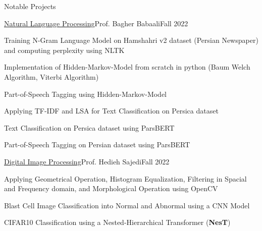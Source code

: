 \documentclass[]{main}
\begin{document}
\begin{section}{Notable Projects}
 \begin{subsection}{\href{https://github.com/ckoliber/nlpexercises}{Natural Language Processing}}{Prof. Bagher Babaali}{Fall 2022}{}
     \item Training N-Gram Language Model on Hamshahri v2 dataset (Persian Newspaper) and computing perplexity using NLTK \;\href{https://github.com/ckoliber/nlpexercises/blob/main/src/exercise1.ipynb}{\faExternalLink*}
     \item Implementation of Hidden-Markov-Model from scratch in python (Baum Welch Algorithm, Viterbi Algorithm) \;\href{https://github.com/ckoliber/nlpexercises/blob/main/src/hmm/hmm.py}{\faExternalLink*}
     \item Part-of-Speech Tagging using Hidden-Markov-Model \;\href{https://github.com/ckoliber/nlpexercises/blob/main/src/exercise3.ipynb}{\faExternalLink*}
     \item Applying TF-IDF and LSA for Text Classification on Persica dataset \;\href{https://github.com/ckoliber/nlpexercises/blob/main/src/exercise4.ipynb}{\faExternalLink*}
     \item Text Classification on Persica dataset using ParsBERT \;\href{https://github.com/ckoliber/nlpexercises/blob/main/src/exercise5.ipynb}{\faExternalLink*}
     \item Part-of-Speech Tagging on Persian dataset using ParsBERT \;\href{https://github.com/ckoliber/nlpexercises/blob/main/src/exercise6.ipynb}{\faExternalLink*}
 \end{subsection}

 \begin{subsection}{\href{https://github.com/ckoliber/dipexercises}{Digital Image Processing}}{Prof. Hedieh Sajedi}{Fall 2022}{}
     \item Applying Geometrical Operation, Histogram Equalization, Filtering in Spacial and Frequency domain, and Morphological Operation using OpenCV \;\href{https://github.com/ckoliber/dipexercises/blob/main/src/exercise1.ipynb}{\faExternalLink*}
     \item Blast Cell Image Classification into Normal and Abnormal using a CNN Model \;\href{https://github.com/ckoliber/dipexercises/blob/main/src/exercise2.ipynb}{\faExternalLink*}
     \item CIFAR10 Classification using a Nested-Hierarchical Transformer (\textbf{NesT}) \;\href{https://github.com/ckoliber/dipexercises/blob/main/src/project.ipynb}{\faExternalLink*}
 \end{subsection}


\end{section}
\end{document}
